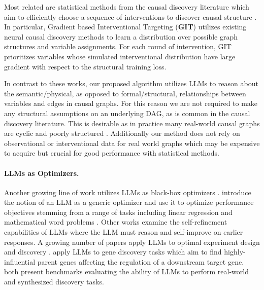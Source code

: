 Most related are statistical methods from the causal discovery literature which aim to efficiently choose a sequence of interventions to discover causal structure \citep{scherrer2022learningneuralcausalmodels,olko2024trustnablagradientbasedintervention}. In particular, Gradient based Interventional Targeting (\textbf{GIT}) \citep{olko2024trustnablagradientbasedintervention} utilizes existing neural causal discovery methods \citep{lippe2022efficientneuralcausaldiscovery} to learn a distribution over possible graph structures and variable assignments. For each round of intervention, GIT prioritizes variables whose simulated interventional distribution have large gradient with respect to the structural training loss.

In contrast to these works, our proposed algorithm utilizes LLMs to reason about the semantic/physical, as opposed to formal/structural, relationships between variables and edges in causal graphs. For this reason we are not required to make any structural assumptions on an underlying DAG, as is common in the causal discovery literature. This is desirable as in practice many real-world causal graphs are cyclic and poorly structured \citep{brain_cg, arctic}. Additionally our method does not rely on observational or interventional data for real world graphs which may be expensive to acquire but crucial for good performance with statistical methods.

\paragraph{LLMs as Optimizers.} Another growing line of work utilizes LLMs as black-box optimizers \citep{yang2024largelanguagemodelsoptimizers, roohani2024biodiscoveryagentaiagentdesigning}. \citet{yang2024largelanguagemodelsoptimizers} introduce the notion of an LLM as a generic optimizer and use it to optimize performance objectives stemming from a range of tasks including linear regression and mathematical word problems \citep{cobbe2021trainingverifierssolvemath}. Other works \citep{madaan2023selfrefineiterativerefinementselffeedback, havrilla2024glorewhenwhereimprove} examine the self-refinement capabilities of LLMs where the LLM must reason and self-improve on earlier responses. A growing number of papers apply LLMs to optimal experiment design and discovery \citep{roohani2024biodiscoveryagentaiagentdesigning, ai4science2023impactlargelanguagemodels,gao2024empoweringbiomedicaldiscoveryai,majumder2024discoverybenchdatadrivendiscoverylarge,jansen2024discoveryworldvirtualenvironmentdeveloping}. \citet{roohani2024biodiscoveryagentaiagentdesigning} apply LLMs to gene discovery tasks which aim to find highly-influential parent genes affecting the regulation of a downstream target gene. \citet{majumder2024discoverybenchdatadrivendiscoverylarge,jansen2024discoveryworldvirtualenvironmentdeveloping} both present benchmarks evaluating the ability of LLMs to perform real-world and synthesized discovery tasks.


